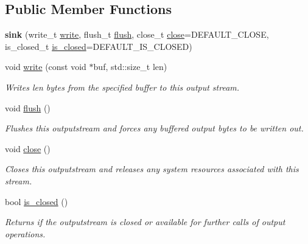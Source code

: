\subsection*{Public Member Functions}
\begin{DoxyCompactItemize}
\item 
\mbox{\label{structdevfix_1_1base_1_1io_1_1sink_a5e065482904521fde4ac8d0e378529c8}} 
{\bfseries sink} (write\+\_\+t \hyperlink{structdevfix_1_1base_1_1io_1_1sink_a6eade9933d316139e952b7a442f3c56d}{write}, flush\+\_\+t \hyperlink{structdevfix_1_1base_1_1io_1_1sink_abf208747c9be8295972fbc4696ddc557}{flush}, close\+\_\+t \hyperlink{structdevfix_1_1base_1_1io_1_1sink_a2d110d27baa88f462540e7fd59fb8b3c}{close}=D\+E\+F\+A\+U\+L\+T\+\_\+\+C\+L\+O\+SE, is\+\_\+closed\+\_\+t \hyperlink{structdevfix_1_1base_1_1io_1_1sink_a1e5782219f9256d8ff09385fa6f3b156}{is\+\_\+closed}=D\+E\+F\+A\+U\+L\+T\+\_\+\+I\+S\+\_\+\+C\+L\+O\+S\+ED)
\item 
void \hyperlink{structdevfix_1_1base_1_1io_1_1sink_a6eade9933d316139e952b7a442f3c56d}{write} (const void $\ast$buf, std\+::size\+\_\+t len)
\begin{DoxyCompactList}\small\item\em Writes len bytes from the specified buffer to this output stream. \end{DoxyCompactList}\item 
void \hyperlink{structdevfix_1_1base_1_1io_1_1sink_abf208747c9be8295972fbc4696ddc557}{flush} ()
\begin{DoxyCompactList}\small\item\em Flushes this {\itshape outputstream} and forces any buffered output bytes to be written out. \end{DoxyCompactList}\item 
void \hyperlink{structdevfix_1_1base_1_1io_1_1sink_a2d110d27baa88f462540e7fd59fb8b3c}{close} ()
\begin{DoxyCompactList}\small\item\em Closes this {\itshape outputstream} and releases any system resources associated with this stream. \end{DoxyCompactList}\item 
bool \hyperlink{structdevfix_1_1base_1_1io_1_1sink_a1e5782219f9256d8ff09385fa6f3b156}{is\+\_\+closed} ()
\begin{DoxyCompactList}\small\item\em Returns if the {\itshape outputstream} is closed or available for further calls of output operations. \end{DoxyCompactList}\end{DoxyCompactItemize}


